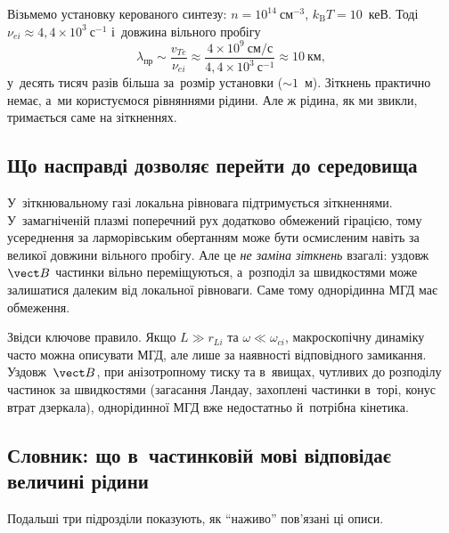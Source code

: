 Візьмемо установку керованого синтезу: $n=10^{14}~\mathrm{см}^{-3}$, $k_{\mathrm
B}T=10$~кеВ. Тоді $\nu_{ei}\approx4{,}4\times10^{3}~\mathrm{с}^{-1}$ і~довжина вільного
пробігу
\begin{equation*}
	\lambda_{\mathrm{пр}}\sim\frac{v_{Te}}{\nu_{ei}}\approx\frac{4\times10^{9}~\text{см/с}}{4{,}4\times10^{3}~\mathrm{с}^{-1}}\approx10~\text{км},
\end{equation*}
у~десять тисяч разів більша за~розмір установки ($\sim1$~м). Зіткнень практично немає,
а~ми користуємося рівняннями рідини. Але ж рідина, як ми звикли, тримається саме на
зіткненнях.



\subsection{Що насправді дозволяє перейти до середовища}



У~зіткнювальному газі локальна рівновага підтримується зіткненнями. У~замагніченій плазмі
поперечний рух додатково обмежений гірацією, тому усереднення за ларморівським обертанням
може бути осмисленим навіть за великої довжини вільного пробігу. Але це \emph{не заміна
зіткнень} взагалі: уздовж~$\vect B$ частинки вільно переміщуються, а~розподіл за
швидкостями може залишатися далеким від локальної рівноваги. Саме тому однорідинна МГД має
обмеження.

\begin{Attention}
	Звідси ключове правило. Якщо $L\gg r_{Li}$ та $\omega\ll\omega_{ci}$, макроскопічну
	динаміку часто можна описувати МГД, але лише за наявності відповідного замикання.
	Уздовж~$\vect B$, при анізотропному тиску та в~явищах, чутливих до розподілу частинок
	за швидкостями (загасання Ландау, захоплені частинки в~торі, конус втрат дзеркала),
	однорідинної МГД вже недостатньо й~потрібна кінетика.
\end{Attention}



\subsection{Словник: що в~частинковій мові відповідає величині рідини}



Подальші три підрозділи показують, як \enquote{наживо} пов'язані ці описи.


